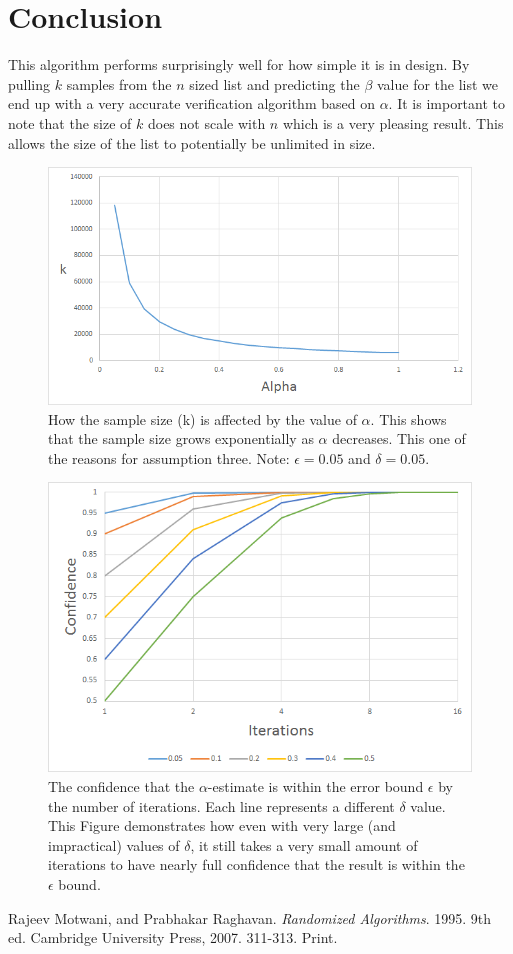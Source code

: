 \documentclass[11pt]{article}
\begin{document}
\section{Conclusion}

This algorithm performs surprisingly well for how simple it is in design. By pulling $k$ samples from the $n$ sized list and predicting the $\beta$ value for the list we end up with a very accurate verification algorithm based on $\alpha$. It is important to note that the size of $k$ does not scale with $n$ which is a very pleasing result. This allows the size of the list to potentially be unlimited in size.  

\newpage
{}
\begin{appendices}

\begin{figure}[h!]
	\centering
	\includegraphics[width=0.7\linewidth]{fig1.png}
	\caption{How the sample size (k) is affected by the value of $\alpha$.		
		This shows that the sample size grows exponentially as $\alpha$ decreases. This one of the reasons for assumption three.
		Note: $\epsilon=0.05$ and $\delta=0.05$.}
\end{figure}

\begin{figure}[h!]
	\centering
	\includegraphics[width=0.7\linewidth]{fig2.png}
	\caption{The confidence that the $\alpha$-estimate is within the error bound $\epsilon$ by the number of iterations. Each line represents a different $\delta$ value. This Figure demonstrates how even with very large (and impractical) values of $\delta$, it still takes a very small amount of iterations to have nearly full confidence that the result is within the $\epsilon$ bound.}
\end{figure}
\end{appendices}

\newpage
{}
\begin{thebibliography}{2}

Rajeev Motwani, and Prabhakar Raghavan.
\textit{Randomized Algorithms}. 1995. 9th ed.
Cambridge University Press, 2007.
311-313. Print.

\end{thebibliography}
\end{document}
